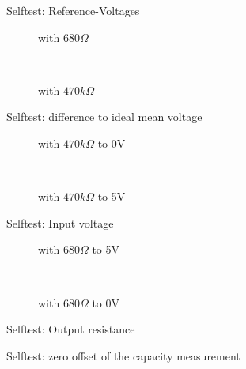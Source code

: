 \begin{figure}[H]
\centering

\caption{Selftest: Reference-Voltages}
\label{fig:SelfTref}
\end{figure}


\begin{figure}[H]
  \begin{subfigure}[b]{9cm}
    \centering
    \resizebox{9cm}{!}{}
    \caption{with \(680 \Omega\)}
    \label{fig:SelfTMitL}
  \end{subfigure}
  ~
  \begin{subfigure}[b]{9cm}
    \centering
    \resizebox{9cm}{!}{}
    \caption{with \(470 k\Omega\)}
    \label{fig:SelfTMitH}
  \end{subfigure}
  \caption{Selftest: difference to ideal mean voltage}
\end{figure}

\begin{figure}[H]
  \begin{subfigure}[b]{9cm}
  \centering
    \resizebox{9cm}{!}{}
    \caption{with \(470 k\Omega\) to 0V}
    \label{fig:SelfTlowH}
  \end{subfigure}
  ~
  \begin{subfigure}[b]{9cm}
  \centering
    \resizebox{9cm}{!}{}
    \caption{with \(470 k\Omega\) to 5V}
    \label{fig:SelfTtopH}
  \end{subfigure}
  \caption{Selftest: Input voltage}
\end{figure}

\begin{figure}[H]
  \begin{subfigure}[b]{9cm}
  \centering
    \resizebox{9cm}{!}{}
    \caption{with \(680 \Omega\) to 5V}
    \label{fig:SelfTRoL}
  \end{subfigure}
  ~
  \begin{subfigure}[b]{9cm}
  \centering
    \resizebox{9cm}{!}{}
    \caption{with \(680 \Omega\) to 0V}
    \label{fig:SelfTRoH}
  \end{subfigure}
  \caption{Selftest: Output resistance}
\end{figure}

\begin{figure}[H]
  \centering
  \resizebox{9cm}{!}{}
  \caption{Selftest: zero offset of the capacity measurement}
  \label{fig:SelfTcap}
\end{figure}

